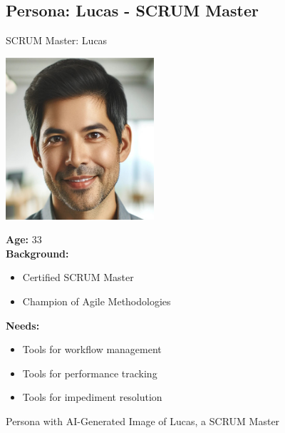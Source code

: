 \begin{figure}[h!]
\subsection*{Persona: Lucas - SCRUM Master}
\begin{persona}{SCRUM Master: Lucas}
\begin{tcbraster}[raster columns=2, raster column skip=5mm]
  \begin{tcolorbox}[width=0.2\linewidth, colback=white, colframe=white, boxrule=0pt, halign=center]
   \includegraphics[width=\linewidth, height=6cm, keepaspectratio]{Images/Lucas.jpg}
  \end{tcolorbox}
  \begin{tcolorbox}[width=0.8\linewidth, colback=white, colframe=white, boxrule=0pt]
  \fontsize{10pt}{9.6pt}\selectfont
    \textbf{Age:} 33\\
    \textbf{Background:} 
    \begin{itemize}
        \item Certified \ac{SCRUM} Master
        \item Champion of Agile Methodologies
    \end{itemize}
    \textbf{Needs:}
        \begin{itemize}
        \item Tools for workflow management
        \item Tools for performance tracking
        \item Tools for impediment resolution
    \end{itemize}
  \end{tcolorbox}
\end{tcbraster}
\end{persona}
\caption{Persona with \ac{AI}-Generated Image of Lucas, a \ac{SCRUM} Master}
\label{fig:persona:lucas}
\end{figure}

